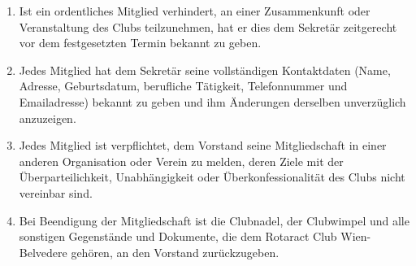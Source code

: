 \documentclass{article}
\begin{document}
\begin{enumerate}
    \item Ist ein ordentliches Mitglied verhindert, an einer Zusammenkunft oder Veranstaltung des Clubs teilzunehmen, hat er dies dem Sekretär zeitgerecht vor dem festgesetzten Termin bekannt zu geben.
    \item Jedes Mitglied hat dem Sekretär seine vollständigen Kontaktdaten (Name, Adresse, Geburtsdatum, berufliche Tätigkeit, Telefonnummer und Emailadresse) bekannt zu geben und ihm Änderungen derselben unverzüglich anzuzeigen.
    \item Jedes Mitglied ist verpflichtet, dem Vorstand seine Mitgliedschaft in einer anderen Organisation oder Verein zu melden, deren Ziele mit der Überparteilichkeit, Unabhängigkeit oder Überkonfessionalität des Clubs nicht vereinbar sind.
    \item Bei Beendigung der Mitgliedschaft ist die Clubnadel, der Clubwimpel und alle sonstigen Gegenstände und Dokumente, die dem Rotaract Club Wien-Belvedere gehören, an den Vorstand zurückzugeben.
\end{enumerate}
\end{document}

